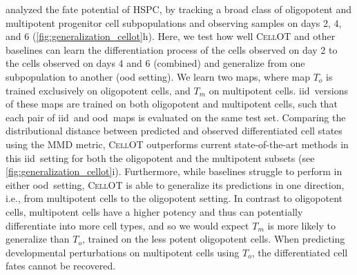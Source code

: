 
\citet{weinreb2020lineage} analyzed the fate potential of \acrfull{HSPC}, by tracking a broad class of oligopotent %
and multipotent %
 progenitor cell subpopulations and observing samples on days 2, 4, and 6 (\cref{fig:generalization_cellot}h).
Here, we test how well \textsc{CellOT} and other baselines can learn the differentiation process of the cells observed on day 2 to the cells observed on days 4 and 6 (combined) and generalize from one subpopulation to another (\acrshort{ood} setting).
We learn two maps, where map $T_o$ is trained exclusively on oligopotent cells, and $T_m$ on multipotent cells.
\acrshort{iid}~versions of these maps are trained on both oligopotent and multipotent cells, such that each pair of \acrshort{iid}~and \acrshort{ood}~maps is evaluated on the same test set.
Comparing the distributional distance between predicted and observed differentiated cell states using the \acrshort{MMD} metric, \textsc{CellOT} outperforms current state-of-the-art methods in this \acrshort{iid}~setting for both the oligopotent and the multipotent subsets (see \cref{fig:generalization_cellot}i).
Furthermore, while baselines struggle to perform in either \acrshort{ood}~setting, \textsc{CellOT} is able to generalize its predictions in one direction, i.e., from multipotent cells to the oligopotent setting.
In contrast to oligopotent cells, multipotent cells have a higher potency and thus can potentially differentiate into more cell types, and so we would expect $T_m$ is more likely to generalize than $T_o$, trained on the less potent oligopotent cells.
When predicting developmental perturbations on multipotent cells using $T_o$, the differentiated cell fates cannot be recovered.

